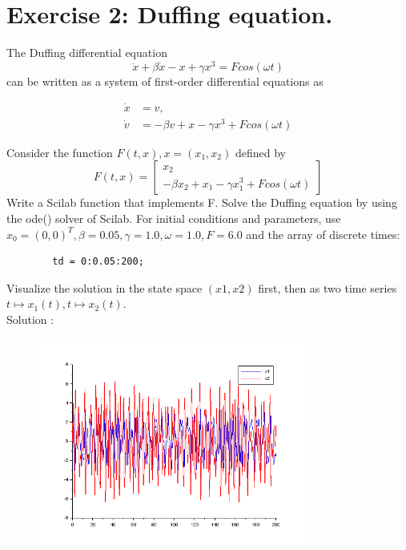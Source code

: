 \documentclass[11pt]{article}
\begin{document}
    \section*{Exercise 2: Duffing equation.}
    The Duffing differential equation
    \[\ddot{x}+\beta \dot{x}-x+\gamma x^3=Fcos(\omega t)\]
    can be written as a system of first-order differential equations as

    \begin{align*}
        \dot{x}&=v,\\
        \dot{v}&=-\beta v+x-\gamma x^3+Fcos(\omega t)
    \end{align*}
    
    Consider the function $F(t, x), x = (x_1, x_2)$ defined by
    $$
    F(t,x)=
    \begin{bmatrix}
        x_2\\
        -\beta x_2+x_1-\gamma x_1^3+Fcos(\omega t)
    \end{bmatrix}
    $$
    Write a Scilab function that implements F. Solve the Duffing equation by using the ode() solver of Scilab. For initial conditions and parameters, use $x_0 = (0, 0)^T , \beta = 0.05, \gamma = 1.0, \omega = 1.0, F = 6.0$ and the array of discrete times:
    \begin{verbatim}
        td = 0:0.05:200;
    \end{verbatim}
    Visualize the solution in the state space $(x1, x2)$ first, then as two time series $t\mapsto x_1(t), t\mapsto x_2(t)$.
    ~\\
    Solution :
    
    \begin{figure}[H]
        \centering
        \includegraphics[width=0.8\textwidth,height=0.5\textwidth]{E2_2}
    \end{figure}
    
\end{document}
